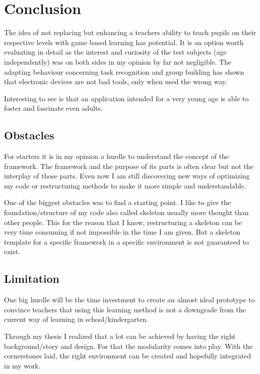 
\chapter{Conclusion}\label{ch:conclusion}
The idea of not replacing but enhancing a teachers ability to teach pupils on their respective levels with
game based learning has potential. It is an option worth evaluating in detail as the interest and curiosity of
the test subjects (age independently) was on both sides in my opinion by far not negligible.
The adapting behaviour concerning task recognition and group building has shown that electronic
devices are not bad tools, only when used the wrong way.

Interesting to see is that an application intended for a very young age is able to foster and fascinate even adults.

\section{Obstacles}\label{sec:obstacles}
For starters it is in my opinion a hurdle to understand the concept of the framework.
The framework and the purpose of its parts is often clear but not the interplay of those parts.
Even now I am still discovering new ways of optimizing my code or restructuring methods to make it more simple and understandable.

One of the biggest obstacles was to find a starting point.
I like to give the foundation/structure of my code also called skeleton usually more thought than other people.
This for the reason that I know, restructuring a skeleton can be very time consuming if not impossible in the time I am given.
But a skeleton template for a specific framework in a specific environment is not guaranteed to exist.

\section{Limitation}\label{sec:limitation}
One big hurdle will be the time investment to create an almost ideal prototype to convince teachers that using this learning
method is not a downgrade from the current way of learning in school/kindergarten.

Through my thesis I realized that a lot can be achieved by having the right background/story and design.
For that the modularity comes into play.
With the cornerstones laid, the right environment can be created and hopefully integrated in my work.

